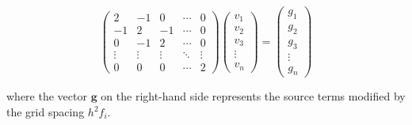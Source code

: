 \[
\begin{pmatrix}
2 & -1 & 0 & \cdots & 0 \\
-1 & 2 & -1 & \cdots & 0 \\
0 & -1 & 2 & \cdots & 0 \\
\vdots & \vdots & \vdots & \ddots & \vdots \\
0 & 0 & 0 & \cdots & 2
\end{pmatrix}
\begin{pmatrix}
v_1 \\
v_2 \\
v_3 \\
\vdots \\
v_n
\end{pmatrix}
=
\begin{pmatrix}
g_1 \\
g_2 \\
g_3 \\
\vdots \\
g_n
\end{pmatrix}
\]

where the vector \( \mathbf{g} \) on the right-hand side represents the source terms modified by the grid spacing \( h^2 f_i \).